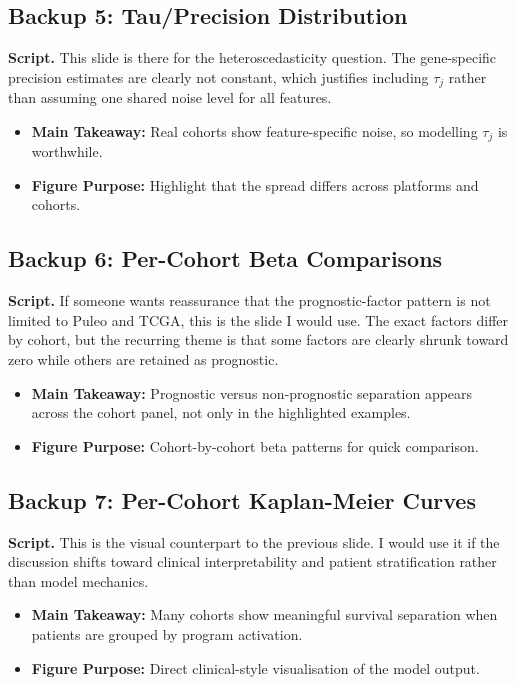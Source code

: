 \documentclass[11pt]{article}
\newcommand{\scriptlabel}{\textbf{Script. }}
\newcommand{\sectionlabel}[1]{\textbf{#1}}
\begin{document}
\subsection*{Backup 5: Tau/Precision Distribution}
\scriptlabel This slide is there for the heteroscedasticity question. The gene-specific precision estimates are clearly not constant, which justifies including $\tau_j$ rather than assuming one shared noise level for all features.

\begin{itemize}
\item \sectionlabel{Main Takeaway:} Real cohorts show feature-specific noise, so modelling $\tau_j$ is worthwhile.
\item \sectionlabel{Figure Purpose:} Highlight that the spread differs across platforms and cohorts.
\end{itemize}

\subsection*{Backup 6: Per-Cohort Beta Comparisons}
\scriptlabel If someone wants reassurance that the prognostic-factor pattern is not limited to Puleo and TCGA, this is the slide I would use. The exact factors differ by cohort, but the recurring theme is that some factors are clearly shrunk toward zero while others are retained as prognostic.

\begin{itemize}
\item \sectionlabel{Main Takeaway:} Prognostic versus non-prognostic separation appears across the cohort panel, not only in the highlighted examples.
\item \sectionlabel{Figure Purpose:} Cohort-by-cohort beta patterns for quick comparison.
\end{itemize}

\subsection*{Backup 7: Per-Cohort Kaplan-Meier Curves}
\scriptlabel This is the visual counterpart to the previous slide. I would use it if the discussion shifts toward clinical interpretability and patient stratification rather than model mechanics.

\begin{itemize}
\item \sectionlabel{Main Takeaway:} Many cohorts show meaningful survival separation when patients are grouped by program activation.
\item \sectionlabel{Figure Purpose:} Direct clinical-style visualisation of the model output.
\end{itemize}
\end{document}
